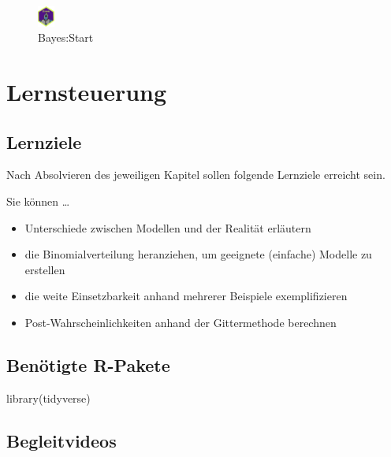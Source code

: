 \documentclass[
  a4paper,
  DIV=11]{scrreprt}
\newenvironment{Shaded}{\begin{snugshade}}{\end{snugshade}}
\newcommand{\FunctionTok}[1]{\textcolor[rgb]{0.28,0.35,0.67}{#1}}
\newcommand{\NormalTok}[1]{\textcolor[rgb]{0.00,0.23,0.31}{#1}}
\providecommand{\tightlist}{%
  \setlength{\itemsep}{0pt}\setlength{\parskip}{0pt}}\usepackage{longtable,booktabs,array}
\theoremstyle{definition}
\theoremstyle{remark}
\begin{document}
\begin{figure}

{\centering \includegraphics[width=0.05\textwidth,height=\textheight]{./img/Golem_hex.png}

}

\caption{Bayes:Start}

\end{figure}

\hypertarget{lernsteuerung-3}{%
\section{Lernsteuerung}\label{lernsteuerung-3}}

\hypertarget{lernziele-4}{%
\subsection{Lernziele}\label{lernziele-4}}

Nach Absolvieren des jeweiligen Kapitel sollen folgende Lernziele
erreicht sein.

Sie können \ldots{}

\begin{itemize}
\tightlist
\item
  Unterschiede zwischen Modellen und der Realität erläutern
\item
  die Binomialverteilung heranziehen, um geeignete (einfache) Modelle zu
  erstellen
\item
  die weite Einsetzbarkeit anhand mehrerer Beispiele exemplifizieren
\item
  Post-Wahrscheinlichkeiten anhand der Gittermethode berechnen
\end{itemize}

\hypertarget{benuxf6tigte-r-pakete-1}{%
\subsection{Benötigte R-Pakete}\label{benuxf6tigte-r-pakete-1}}

\begin{Shaded}
\begin{Highlighting}[]
\FunctionTok{library}\NormalTok{(tidyverse)}
\end{Highlighting}
\end{Shaded}

\hypertarget{begleitvideos-3}{%
\subsection{Begleitvideos}\label{begleitvideos-3}}
\end{document}
